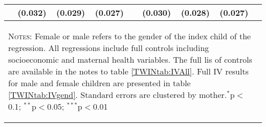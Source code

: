 \begin{table}[htpb!]
\begin{center}
\begin{tabular}{lcccccccc}
&(0.032)&(0.029)&(0.027)&&(0.030)&(0.028)&(0.027)&\\
\midrule\multicolumn{9}{p{14.2cm}}{\begin{footnotesize}\textsc{Notes:} Female or male refers to the gender of the index child of the regression. 
All regressions include full controls including socioeconomic and maternal health variables.  The full lis of controls are available in 
the notes to table \ref{TWINtab:IVAll}.  Full IV results for male and female children are presented in table \ref{TWINtab:IVgend}. Standard errors are clustered 
 by mother.$^{*}$p$<$0.1; $^{**}$p$<$0.05; $^{***}$p$<$0.01
\end{footnotesize}} \\ \bottomrule 
\end{tabular}\end{center}\end{table}